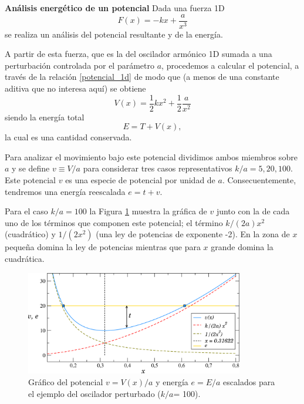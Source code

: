 \documentclass[10pt,oneside]{CBFT_book}
\begin{document}
\begin{ejemplo}{\bfseries Análisis energético de un potencial }
\label{ejemplo_analisis_potencial}
Dada una fuerza 1D 
\[
	F(x) = -k x + \frac{a}{x^3}
\]
se realiza un análisis del potencial resultante y de la energía.

A partir de esta fuerza, que es la del oscilador armónico 1D sumada a una perturbación controlada por el parámetro 
$a$, procedemos a calcular el potencial, a través de la relación \eqref{potencial_1d} de modo que (a menos de una 
constante aditiva que no interesa aquí) se obtiene
\[
	V(x) = \frac{1}{2} k x^2 + \frac{1}{2} \frac{a}{x^2}
\]
siendo la energía total 
\[
	E = T + V( x ), 
\]
la cual es una cantidad conservada.

Para analizar el movimiento bajo este potencial dividimos ambos miembros sobre $ a $ y se define $ v \equiv V/a$ para 
considerar tres casos representativos $ k / a = 5, 20, 100 $. Este potencial $ v $ es una especie de potencial por 
unidad de $ a $. Consecuentemente, tendremos una energía reescalada $ e = t + v $.

Para el caso $ k / a = 100 $ la Figura \ref{fig_mc_problema2_1} muestra la gráfica de $ v $ junto con la de cada 
uno de los términos que componen este potencial; el término $k/(2a) x^2$ (cuadrático) y $1/(2x^2)$ (una ley de potencias 
de exponente -2). En la zona de $ x $ pequeña domina la ley de potencias mientras que para $ x $ grande domina la 
cuadrática. 

\begin{figure}[!ht]
	\begin{center}
	\includegraphics[width=0.85\textwidth]{images/fig_mc_problema2_1.pdf}	
	\end{center}
	\vspace*{-5mm}
	\caption{Gráfico del potencial $v=V(x)/a$ y energía $e=E/a$ escalados para el ejemplo del oscilador perturbado 
	($ k/a $= 100).}
	\label{fig_mc_problema2_1}
\end{figure} 


\end{ejemplo}
\end{document}
